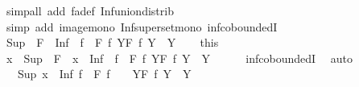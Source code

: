 \begin{isabellebody}
\ {\isacharparenleft}{\kern0pt}simp{\isacharunderscore}{\kern0pt}all\ add{\isacharcolon}{\kern0pt}\ fa{\isacharunderscore}{\kern0pt}def\ Inf{\isacharunderscore}{\kern0pt}union{\isacharunderscore}{\kern0pt}distrib{\isacharparenright}{\kern0pt}\isanewline
\ \ \ \ \isamarkupfalse%
\ {\isacharparenleft}{\kern0pt}simp\ add{\isacharcolon}{\kern0pt}\ image{\isacharunderscore}{\kern0pt}mono\ Inf{\isacharunderscore}{\kern0pt}superset{\isacharunderscore}{\kern0pt}mono\ inf{\isachardot}{\kern0pt}coboundedI{}{\isacharparenright}{\kern0pt}\isanewline
\ \ \ \ \isamarkupfalse%
\isanewline
\ \ \isamarkupfalse%
\ {\isachardoublequoteopen}{\isasymSqinter}{\isacharparenleft}{\kern0pt}Sup\ {\isacharbackquote}{\kern0pt}\ F{\isacharparenright}{\kern0pt}\ {\isasymle}\ {\isasymSqunion}{\isacharparenleft}{\kern0pt}Inf\ {\isacharbackquote}{\kern0pt}\ {\isacharbraceleft}{\kern0pt}f\ {\isacharbackquote}{\kern0pt}\ F\ {\isacharbar}{\kern0pt}f{\isachardot}{\kern0pt}\ {\isasymforall}Y{\isasymin}F{\isachardot}{\kern0pt}\ f\ Y\ {\isasymin}\ Y{\isacharbraceright}{\kern0pt}{\isacharparenright}{\kern0pt}{\isachardoublequoteclose}\isanewline
\isanewline
\ \ \isamarkupfalse%
\ this\ \isamarkupfalse%
\ {\isachardoublequoteopen}{\isasymSqunion}x\ {\isasymsqinter}\ {\isasymSqinter}{\isacharparenleft}{\kern0pt}Sup\ {\isacharbackquote}{\kern0pt}\ F{\isacharparenright}{\kern0pt}\ {\isasymle}\ {\isasymSqunion}x\ {\isasymsqinter}\ {\isasymSqunion}{\isacharparenleft}{\kern0pt}Inf\ {\isacharbackquote}{\kern0pt}\ {\isacharbraceleft}{\kern0pt}f\ {\isacharbackquote}{\kern0pt}\ F\ {\isacharbar}{\kern0pt}f{\isachardot}{\kern0pt}\ {\isasymforall}Y{\isasymin}F{\isachardot}{\kern0pt}\ f\ Y\ {\isasymin}\ Y{\isacharbraceright}{\kern0pt}{\isacharparenright}{\kern0pt}{\isachardoublequoteclose}\isanewline
\ \ \ \ \isamarkupfalse%
\ inf{\isachardot}{\kern0pt}coboundedI{}\ \isamarkupfalse%
\ auto\isanewline
\ \ \isamarkupfalse%
\ \isamarkupfalse%
\ {\isachardoublequoteopen}{\isachardot}{\kern0pt}{\isachardot}{\kern0pt}{\isachardot}{\kern0pt}\ {\isacharequal}{\kern0pt}\ Sup\ {\isacharbraceleft}{\kern0pt}{\isasymSqunion}x\ {\isasymsqinter}\ {\isacharparenleft}{\kern0pt}Inf\ {\isacharparenleft}{\kern0pt}f\ {\isacharbackquote}{\kern0pt}\ F{\isacharparenright}{\kern0pt}{\isacharparenright}{\kern0pt}\ {\isacharbar}{\kern0pt}f\ \ {\isachardot}{\kern0pt}\ \ {\isacharparenleft}{\kern0pt}{\isasymforall}Y{\isasymin}F{\isachardot}{\kern0pt}\ f\ Y\ {\isasymin}\ Y{\isacharparenright}{\kern0pt}{\isacharbraceright}{\kern0pt}{\isachardoublequoteclose}\isanewline

\end{isabellebody}
